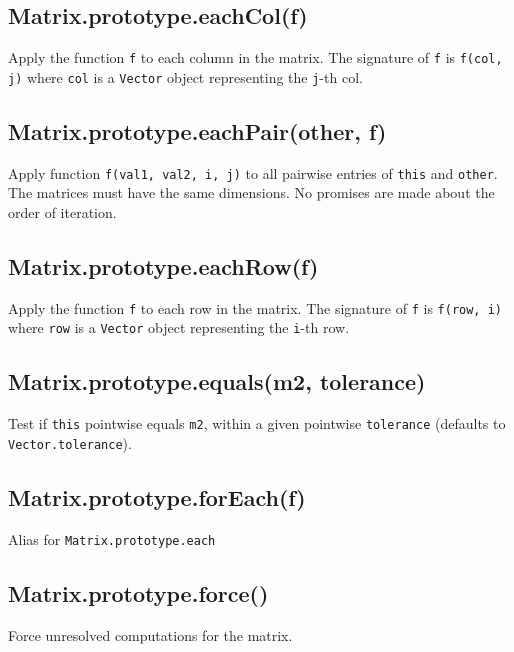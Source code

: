 \documentclass{article}
\begin{document}
    \subsection*{Matrix.prototype.eachCol(f)}
    Apply the function \texttt{f} to each column in the matrix. The signature of \texttt{f} is
\texttt{f(col, j)} where \texttt{col} is a \texttt{Vector} object representing the \texttt{j}-th col.


    \subsection*{Matrix.prototype.eachPair(other, f)}
    Apply function \texttt{f(val1, val2, i, j)} to all pairwise entries of \texttt{this} and \texttt{other}.
The matrices must have the same dimensions. No promises are made about the order of
iteration.


    \subsection*{Matrix.prototype.eachRow(f)}
    Apply the function \texttt{f} to each row in the matrix. The signature of \texttt{f} is
\texttt{f(row, i)} where \texttt{row} is a \texttt{Vector} object representing the \texttt{i}-th row.


    \subsection*{Matrix.prototype.equals(m2, tolerance)}
    Test if \texttt{this} pointwise equals \texttt{m2}, within a given pointwise \texttt{tolerance}
(defaults to \texttt{Vector.tolerance}).


    \subsection*{Matrix.prototype.forEach(f)}
    Alias for \texttt{Matrix.prototype.each}


    \subsection*{Matrix.prototype.force()}
    Force unresolved computations for the matrix.
\end{document}
